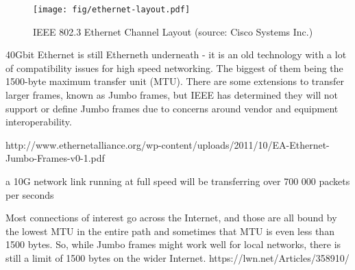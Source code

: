 \begin{figure}
	\centering
	\texttt{[image: fig/ethernet-layout.pdf]}
	\caption{IEEE 802.3 Ethernet Channel Layout (source: Cisco Systems Inc.)}
	\label{fig:40gbit-ethernet-layout}
	\bigskip
\end{figure}

40Gbit Ethernet is still Etherneth underneath - it is an old technology with a lot of compatibility issues for high speed networking.
The biggest of them being the 1500-byte maximum transfer unit (MTU).
There are some extensions to transfer larger frames, known as Jumbo frames,
but IEEE has determined they will not support or define Jumbo frames due to concerns around vendor and equipment interoperability.

http://www.ethernetalliance.org/wp-content/uploads/2011/10/EA-Ethernet-Jumbo-Frames-v0-1.pdf


a 10G network link running at full speed will be transferring over 700 000 packets per seconds

Most connections of interest go across the Internet, and those are all bound by the lowest MTU in the entire path
and sometimes that MTU is even less than 1500 bytes.
So, while Jumbo frames might work well for local networks, there is still a limit of 1500 bytes on the wider Internet.
https://lwn.net/Articles/358910/
